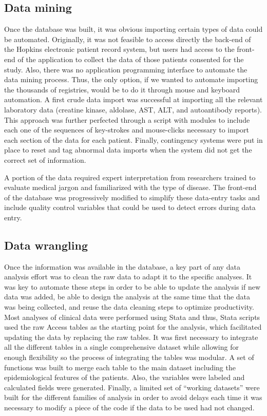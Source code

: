 \subsection{Data mining}
Once the database was built, it was obvious importing certain types of data could be automated. Originally, it was not feasible to access directly the back-end of the Hopkins electronic patient record system, but users had access to the front-end of the application to collect the data of those patients consented for the study. Also, there was no application programming interface to automate the data mining process. Thus, the only option, if we wanted to automate importing the thousands of registries, would be to do it through mouse and keyboard automation. A first crude data import was successful at importing all the relevant laboratory data (creatine kinase, aldolase, AST, ALT, and autoantibody reports). This approach was further perfected through a script with modules to include each one of the sequences of key-strokes and mouse-clicks necessary to import each section of the data for each patient. Finally, contingency systems were put in place to reset and tag abnormal data imports when the system did not get the correct set of information.

A portion of the data required expert interpretation from researchers trained to evaluate medical jargon and familiarized with the type of disease. The front-end of the database was progressively modified to simplify these data-entry tasks and include quality control variables that could be used to detect errors during data entry.

\subsection{Data wrangling}
Once the information was available in the database, a key part of any data analysis effort was to clean the raw data to adapt it to the specific analyses. It was key to automate these steps in order to be able to update the analysis if new data was added, be able to design the analysis at the same time that the data was being collected, and reuse the data cleaning steps to optimize productivity. Most analyses of clinical data were performed using Stata and thus, Stata scripts used the raw Access tables as the starting point for the analysis, which facilitated updating the data by replacing the raw tables. It was first necessary to integrate all the different tables in a single comprehensive dataset while allowing for enough flexibility so the process of integrating the tables was modular. A set of functions was built to merge each table to the main dataset including the epidemiological features of the patients. Also, the variables were labeled and calculated fields were generated. Finally, a limited set of “working datasets” were built for the different families of analysis in order to avoid delays each time it was necessary to modify a piece of the code if the data to be used had not changed.

